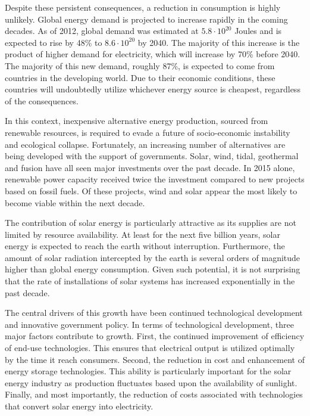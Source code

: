 Despite these persistent consequences, a reduction in consumption is highly unlikely. Global energy demand is projected to increase rapidly in the coming decades. As of  2012, global demand was estimated at $5.8\cdot 10^{20}$ Joules and is expected to rise by 48\% to $8.6\cdot 10^{20}$ by 2040\cite{EIAOutlook2016}. The majority of this increase is the product of higher demand for electricity, which will increase by 70\% before 2040. The majority of this new demand, roughly 87\%, is expected to come from countries in the developing world\cite{OECD2015}. Due to their economic conditions, these countries will undoubtedly utilize whichever energy source is cheapest, regardless of the consequences. 

In this context, inexpensive alternative energy production, sourced from renewable resources, is required to evade a future of socio-economic instability and ecological collapse. Fortunately, an increasing number of alternatives are being developed with the support of governments. Solar, wind, tidal, geothermal and fusion have all seen major investments over the past decade. In 2015 alone, renewable power capacity received twice the investment compared to new projects based on fossil fuels\cite{FrankfurtSchool2016}. Of these projects, wind and solar appear the most likely to become viable within the next decade\cite{OECD2014}. 

The contribution of solar energy is particularly attractive as its supplies are not limited by resource availability. At least for the next five billion years, solar energy is expected to reach the earth without interruption. Furthermore, the amount of solar radiation intercepted by the earth is several orders of magnitude higher than global energy consumption\cite{Goldemberg2000}. Given such potential, it is not surprising that the rate of installations of solar systems has increased exponentially in the past decade\cite{EPIA2014}. 

The central drivers of this growth have been continued technological development and innovative government policy. In terms of technological development, three major factors contribute to growth. First, the continued improvement of efficiency of end-use technologies. This ensures that electrical output is utilized optimally by the time it reach consumers\cite{Wilson2012}. Second, the reduction in cost and enhancement of energy storage technologies\cite{IRENA2015}. This ability is particularly important for the solar energy industry as production fluctuates based upon the availability of sunlight. Finally, and most importantly, the reduction of costs associated with technologies that convert solar energy into electricity.

